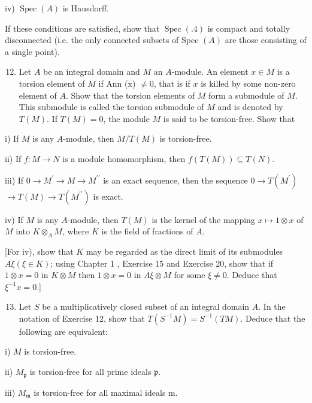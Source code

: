 \documentclass{standalone}
\theoremstyle{definition}
\theoremstyle{remark}
\begin{document}
iv) $\operatorname{Spec}(A)$ is Hausdorff.

If these conditions are satisfied, show that $\operatorname{Spec}(.4)$ is compact and totally disconnected (i.e. the only connected subsets of Spec $(A)$ are those consisting of a single point).

\begin{enumerate}
  \setcounter{enumi}{11}
  \item Let $A$ be an integral domain and $M$ an $A$-module. An element $x \in M$ is a torsion element of $M$ if Ann (x) $\neq 0$, that is if $x$ is killed by some non-zero element of $A$. Show that the torsion elements of $M$ form a submodule of $M$. This submodule is called the torsion submodule of $M$ and is denoted by $T(M)$. If $T(M)=0$, the module $M$ is said to be torsion-free. Show that
\end{enumerate}

i) If $M$ is any $A$-module, then $M / T(M)$ is torsion-free.

ii) If $f: M \rightarrow N$ is a module homomorphism, then $f(T(M)) \subseteq T(N)$.

iii) If $0 \rightarrow M^{\prime} \rightarrow M \rightarrow M^{\prime \prime}$ is an exact sequence, then the sequence $0 \rightarrow T\left(M^{\prime}\right)$ $\rightarrow T(M) \rightarrow T\left(M^{\prime \prime}\right)$ is exact.

iv) If $M$ is any $A$-module, then $T(M)$ is the kernel of the mapping $x \mapsto 1 \otimes x$ of $M$ into $K \otimes_{A} M$, where $K$ is the field of fractions of $A$.

[For iv), show that $K$ may be regarded as the direct limit of its submodules $A \xi(\xi \in K)$; using Chapter 1 , Exercise 15 and Exercise 20, show that if $1 \otimes x=0$ in $K \otimes M$ then $1 \otimes x=0$ in $A \xi \otimes M$ for some $\xi \neq 0$. Deduce that $\xi^{-1} x=0$.]

\begin{enumerate}
  \setcounter{enumi}{12}
  \item Let $S$ be a multiplicatively closed subset of an integral domain $A$. In the notation of Exercise 12, show that $T\left(S^{-1} M\right)=S^{-1}(T M)$. Deduce that the following are equivalent:
\end{enumerate}

i) $M$ is torsion-free.

ii) $M_{\mathfrak{p}}$ is torsion-free for all prime ideals $\mathfrak{p}$.

iii) $M_{\mathfrak{m}}$ is torsion-free for all maximal ideals $\mathrm{m}$.
\end{document}
